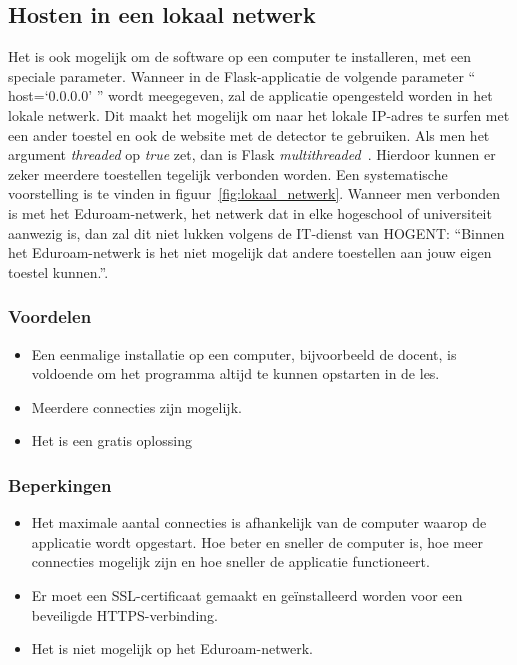 \subsection{Hosten in een lokaal netwerk}
Het is ook mogelijk om de software op een computer te installeren, met een speciale parameter. Wanneer in de Flask-applicatie de volgende parameter `` host=`0.0.0.0' '' wordt meegegeven, zal de applicatie opengesteld worden in het lokale netwerk. Dit maakt het mogelijk om naar het lokale IP-adres te surfen met een ander toestel en ook de website met de detector te gebruiken. Als men het argument \textit{threaded} op \textit{true} zet, dan is Flask \textit{multithreaded}~\autocite{Vieira2013}. Hierdoor kunnen er zeker meerdere toestellen tegelijk verbonden worden. Een systematische voorstelling is te vinden in figuur~\ref{fig:lokaal_netwerk}. Wanneer men verbonden is met het Eduroam-netwerk, het netwerk dat in elke hogeschool of universiteit aanwezig is, dan zal dit niet lukken volgens de IT-dienst van HOGENT: ``Binnen het Eduroam-netwerk is het niet mogelijk dat andere toestellen aan jouw eigen toestel kunnen.''.

\subsubsection{Voordelen}
\begin{itemize}
    \item Een eenmalige installatie op een computer, bijvoorbeeld de docent, is voldoende om het programma altijd te kunnen opstarten in de les.
    \item Meerdere connecties zijn mogelijk.
    \item Het is een gratis oplossing
\end{itemize}
\subsubsection{Beperkingen}
\begin{itemize}
    \item Het maximale aantal connecties is afhankelijk van de computer waarop de applicatie wordt opgestart. Hoe beter en sneller de computer is, hoe meer connecties mogelijk zijn en hoe sneller de applicatie functioneert.
    \item Er moet een SSL-certificaat gemaakt en geïnstalleerd worden voor een beveiligde HTTPS-verbinding.
    \item Het is niet mogelijk op het Eduroam-netwerk.
\end{itemize}

